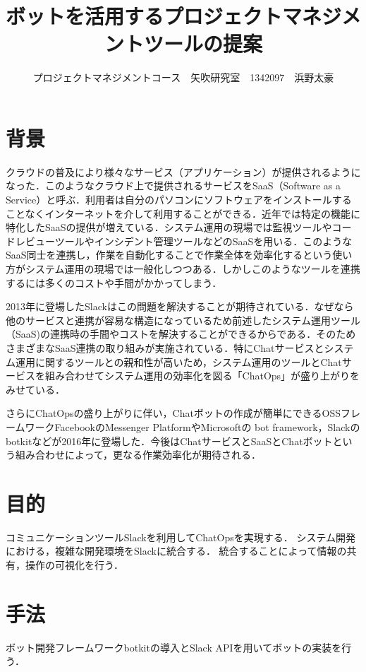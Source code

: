 \documentclass[uplatex,twocolumn,dvipdfmx]{jsarticle}
\title{\vspace{-5mm}\fontsize{14pt}{0pt}\selectfont ボットを活用するプロジェクトマネジメントツールの提案}
\author{\normalsize プロジェクトマネジメントコース　矢吹研究室　1342097　浜野太豪}
\date{}
\begin{document}
\fontsize{10.5pt}{\baselineskip}\selectfont
\maketitle





\section{背景}
クラウドの普及により様々なサービス（アプリケーション）が提供されるようになった．このようなクラウド上で提供されるサービスをSaaS（Software as a Service）と呼ぶ．利用者は自分のパソコンにソフトウェアをインストールすることなくインターネットを介して利用することができる\cite{saas}．近年では特定の機能に特化したSaaSの提供が増えている．システム運用の現場では監視ツールやコードレビューツールやインシデント管理ツールなどのSaaSを用いる．このようなSaaS同士を連携し，作業を自動化することで作業全体を効率化するという使い方がシステム運用の現場では一般化しつつある．しかしこのようなツールを連携するには多くのコストや手間がかかってしまう．

2013年に登場したSlackはこの問題を解決することが期待されている．なぜなら他のサービスと連携が容易な構造になっているため\cite{slack}前述したシステム運用ツール（SaaS)の連携時の手間やコストを解決することができるからである．そのためさまざまなSaaS連携の取り組みが実施されている．特にChatサービスとシステム運用に関するツールとの親和性が高いため，システム運用のツールとChatサービスを組み合わせてシステム運用の効率化を図る「ChatOps」が盛り上がりをみせている．

さらにChatOpsの盛り上がりに伴い，Chatボットの作成が簡単にできるOSSフレームワークFacebookのMessenger PlatformやMicrosoftの bot framework，Slackのbotkitなどが2016年に登場した．今後はChatサービスとSaaSとChatボットという組み合わせによって，更なる作業効率化が期待される．






\section{目的}
コミュニケーションツールSlackを利用してChatOpsを実現する．
システム開発における，複雑な開発環境をSlackに統合する．
統合することによって情報の共有，操作の可視化を行う．



\section{手法}
ボット開発フレームワークbotkitの導入とSlack APIを用いてボットの実装を行う．
\end{document}
